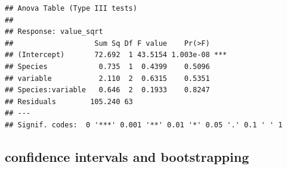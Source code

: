 \documentclass[]{article}
\begin{document}
\begin{verbatim}
## Anova Table (Type III tests)
## 
## Response: value_sqrt
##                   Sum Sq Df F value    Pr(>F)    
## (Intercept)       72.692  1 43.5154 1.003e-08 ***
## Species            0.735  1  0.4399    0.5096    
## variable           2.110  2  0.6315    0.5351    
## Species:variable   0.646  2  0.1933    0.8247    
## Residuals        105.240 63                      
## ---
## Signif. codes:  0 '***' 0.001 '**' 0.01 '*' 0.05 '.' 0.1 ' ' 1
\end{verbatim}

\subsection{confidence intervals and
bootstrapping}\label{confidence-intervals-and-bootstrapping-2}
\end{document}
